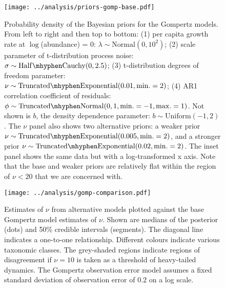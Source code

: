\clearpage

\begin{figure}[htbp]
\begin{center}
\texttt{[image: ../analysis/priors-gomp-base.pdf]}
\caption{
Probability density of the Bayesian priors for the Gompertz models. From left to right and then top to bottom: (1) per capita growth rate at $\log$(abundance) = $0$: $\lambda \sim \mathrm{Normal}(0, 10^2)$; (2) scale parameter of t-distribution process noise: $\sigma \sim \mathrm{Half\mhyphen Cauchy} (0, 2.5)$; (3) t-distribution degrees of freedom parameter: $\nu \sim \mathrm{Truncated\mhyphen Exponential}(0.01, \mathrm{min.} = 2)$; (4) AR1 correlation coefficient of residuals: $\phi \sim \mathrm{Truncated \mhyphen Normal}(0, 1, \mathrm{min.} = -1, \mathrm{max.} = 1)$. Not shown is $b$, the density dependence parameter: $b \sim \mathrm{Uniform}(-1, 2)$. The $\nu$ panel also shows two alternative priors: a weaker prior $\nu \sim \mathrm{Truncated\mhyphen Exponential}(0.005, \mathrm{min.} = 2)$, and a stronger prior $\nu \sim \mathrm{Truncated\mhyphen Exponential}(0.02, \mathrm{min.} = 2)$. The inset panel shows the same data but with a log-transformed x axis. Note that the base and weaker priors are relatively flat within the region of $\nu < 20$ that we are concerned with.
}
\label{fig:priors}
\end{center}
\end{figure}

\clearpage

\begin{figure}[htbp]
\begin{center}
\texttt{[image: ../analysis/gomp-comparison.pdf]}
\caption{
  Estimates of $\nu$ from alternative models plotted against the base Gompertz
  model estimates of $\nu$. Shown are medians of the posterior (dots) and 50\%
  credible intervals (segments). The diagonal line indicates a one-to-one
  relationship. Different colours indicate various taxonomic classes. The
  grey-shaded regions indicate regions of disagreement if $\nu = 10$ is taken
  as a threshold of heavy-tailed dynamics. The Gompertz observation error model
  assumes a fixed standard deviation of observation error of $0.2$ on a log
  scale.
}
\label{fig:alt}
\end{center}
\end{figure}

\clearpage

